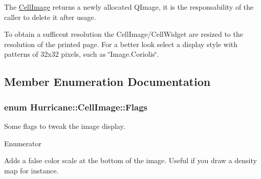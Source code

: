 The \hyperlink{classHurricane_1_1CellImage}{Cell\-Image} returns a newly allocated Q\-Image, it is the responsability of the caller to delete it after usage.

To obtain a sufficent resolution the Cell\-Image/\-Cell\-Widget are resized to the resolution of the printed page. For a better look select a display style with patterns of 32x32 pixels, such as {\ttfamily \char`\"{}\-Image.\-Coriolis\char`\"{}}. 

\subsection{Member Enumeration Documentation}
\hypertarget{classHurricane_1_1CellImage_a5836ca863f8bc47702ca040ac8897703}{
\subsubsection[{Flags}]{\setlength{\rightskip}{0pt plus 5cm}enum {\bf Hurricane\-::\-Cell\-Image\-::\-Flags}}}\label{classHurricane_1_1CellImage_a5836ca863f8bc47702ca040ac8897703}
Some flags to tweak the image display. \begin{Desc}
\item[Enumerator]\par
\begin{description}
\item[{\em 
\hypertarget{classHurricane_1_1CellImage_a5836ca863f8bc47702ca040ac8897703a5463e21b19fa7d390bfe239121195879}{Show\-Scale}\label{classHurricane_1_1CellImage_a5836ca863f8bc47702ca040ac8897703a5463e21b19fa7d390bfe239121195879}
}]Adds a false color scale at the bottom of the image. Useful if you draw a density map for instance. \end{description}
\end{Desc}


